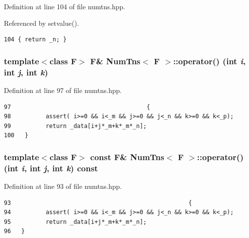 Definition at line 104 of file numtns.hpp.

Referenced by setvalue().

\footnotesize\begin{verbatim}104 { return _n; }
\end{verbatim}\normalsize 


\subsubsection{\setlength{\rightskip}{0pt plus 5cm}template$<$class F$>$ F\& {\bf Num\-Tns}$<$ F $>$::operator() (int {\em i}, int {\em j}, int {\em k})\hspace{0.3cm}{\tt  [inline]}}\label{classNumTns_98d16077f76916ac1ab79f5d3ea6927f_98d16077f76916ac1ab79f5d3ea6927f}




Definition at line 97 of file numtns.hpp.

\footnotesize\begin{verbatim}97                                       { 
98          assert( i>=0 && i<_m && j>=0 && j<_n && k>=0 && k<_p);
99          return _data[i+j*_m+k*_m*_n];
100   }
\end{verbatim}\normalsize 


\subsubsection{\setlength{\rightskip}{0pt plus 5cm}template$<$class F$>$ const F\& {\bf Num\-Tns}$<$ F $>$::operator() (int {\em i}, int {\em j}, int {\em k}) const\hspace{0.3cm}{\tt  [inline]}}\label{classNumTns_08f373a6228cbf6d82774853369056e3_08f373a6228cbf6d82774853369056e3}




Definition at line 93 of file numtns.hpp.

\footnotesize\begin{verbatim}93                                                   { 
94          assert( i>=0 && i<_m && j>=0 && j<_n && k>=0 && k<_p);
95          return _data[i+j*_m+k*_m*_n];
96   }
\end{verbatim}\normalsize 


